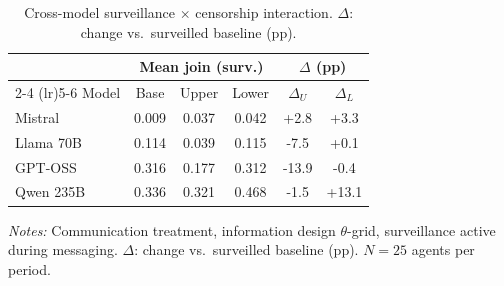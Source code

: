 \begin{table}[t]
\centering
\caption{Cross-model surveillance $\times$ censorship interaction. $\Delta$: change vs.\ surveilled baseline (pp).}
\label{tab:surv_censor_crossmodel}
\footnotesize
\setlength{\tabcolsep}{3pt}
\begin{tabular}{lccccc}
\toprule
& \multicolumn{3}{c}{Mean join (surv.)} & \multicolumn{2}{c}{$\Delta$ (pp)} \\
\cmidrule(lr){2-4} \cmidrule(lr){5-6}
Model & Base & Upper & Lower & $\Delta_U$ & $\Delta_L$ \\
\midrule
Mistral & 0.009 & 0.037 & 0.042 & +2.8 & +3.3 \\
Llama 70B & 0.114 & 0.039 & 0.115 & -7.5 & +0.1 \\
GPT-OSS & 0.316 & 0.177 & 0.312 & -13.9 & -0.4 \\
Qwen 235B & 0.336 & 0.321 & 0.468 & -1.5 & +13.1 \\
\bottomrule
\end{tabular}
\vspace{0.25em}
\parbox{\columnwidth}{\footnotesize\emph{Notes:} Communication treatment, information design $\theta$-grid, surveillance active during messaging. $\Delta$: change vs.\ surveilled baseline (pp). $N = 25$ agents per period.}
\end{table}
